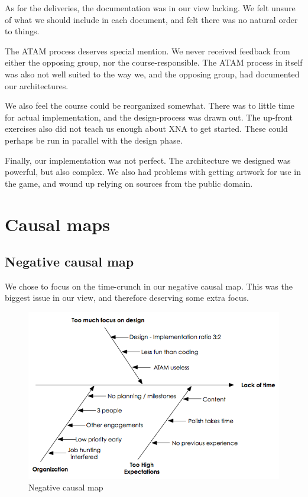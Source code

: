 \documentclass[titlepage,a4paper,11pt]{article}
\begin{document}
As for the deliveries, the documentation was in our view lacking. We felt
unsure of what we should include in each document, and felt there was no
natural order to things.

The ATAM process deserves special mention. We never received feedback from
either the opposing group, nor the course-responsible. The ATAM process in
itself was also not well suited to the way we, and the opposing group, had
documented our architectures.

We also feel the course could be reorganized somewhat. There was to little
time for actual implementation, and the design-process was drawn out.
The up-front exercises also did not teach us enough about XNA to get 
started. These could perhaps be run in parallel with the design phase.

Finally, our implementation was not perfect. The architecture we designed
was powerful, but also complex. We also had problems with getting artwork
for use in the game, and wound up relying on sources from the public
domain.

\section{Causal maps}

\subsection{Negative causal map}
We chose to focus on the time-crunch in our negative causal map. This was
the biggest issue in our view, and therefore deserving some extra focus.

\begin{figure}
    \begin{center}
    \includegraphics[width=\linewidth]{graphics/negMap}
    \caption{Negative causal map}
    \label{fig:negmap}
    \end{center}
\end{figure}
\end{document}
